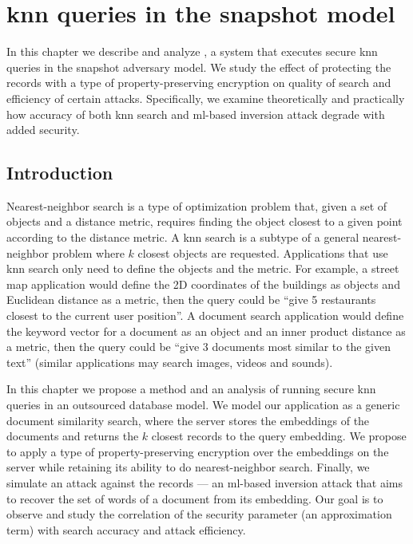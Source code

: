 \chapter{\texorpdfstring{\acrshort{knn}}{kNN} queries in the snapshot model}\label{section:knn-snapshot}
\thispagestyle{myheadings}

	In this chapter we describe and analyze \kanon{}, a system that executes secure \acrshort{knn} queries in the snapshot adversary model.
	We study the effect of protecting the records with a type of property-preserving encryption on quality of search and efficiency of certain attacks.
	Specifically, we examine theoretically and practically how accuracy of both \acrshort{knn} search and \acrshort{ml}-based inversion attack degrade with added security.

	\section{Introduction}

		Nearest-neighbor search is a type of optimization problem that, given a set of objects and a distance metric, requires finding the object closest to a given point according to the distance metric.
		A \acrfull{knn} search is a subtype of a general nearest-neighbor problem where $k$ closest objects are requested.
		Applications that use \acrshort{knn} search only need to define the objects and the metric.
		For example, a street map application would define the 2D coordinates of the buildings as objects and Euclidean distance as a metric, then the query could be ``give 5 restaurants closest to the current user position''.
		A document search application would define the keyword vector for a document as an object and an inner product distance as a metric, then the query could be ``give 3 documents most similar to the given text'' (similar applications may search images, videos and sounds).

		In this chapter we propose a method and an analysis of running secure \acrshort{knn} queries in an outsourced database model.
		We model our application as a generic document similarity search, where the server stores the embeddings of the documents and returns the $k$ closest records to the query embedding.
		We propose to apply a type of property-preserving encryption over the embeddings on the server while retaining its ability to do nearest-neighbor search.
		Finally, we simulate an attack against the records --- an \acrshort{ml}-based inversion attack that aims to recover the set of words of a document from its embedding.
		Our goal is to observe and study the correlation of the security parameter (an approximation term) with search accuracy and attack efficiency.

